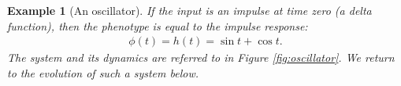 \documentclass{article}
\newcommand{\1}{\mathbbm{1}}
\newtheorem{example}{Example}
\begin{document}
\begin{example}[An oscillator]
If the input is an impulse at time zero (a delta function), 
then the phenotype is equal to the impulse response: 
\begin{align*}
\phi(t) = h(t) = \sin t + \cos t  .
\end{align*}
The system and its dynamics are referred to in Figure \ref{fig:oscillator}. We return to the evolution of such a system below.   
\end{example}
\end{document}
